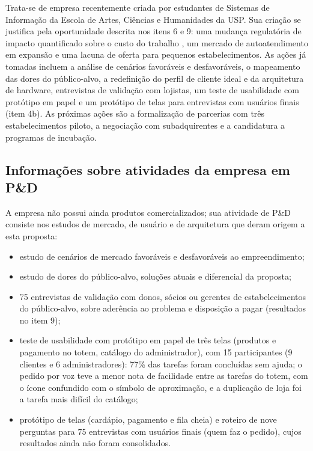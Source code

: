 \documentclass[12pt,a4paper]{article}
\begin{document}
Trata-se de empresa recentemente criada por estudantes de Sistemas de Informação da Escola de Artes, Ciências e Humanidades da USP. Sua criação se justifica pela oportunidade descrita nos itens 6 e 9: uma mudança regulatória de impacto quantificado sobre o custo do trabalho \cite{fecomercio2026, abrasel2026}, um mercado de autoatendimento em expansão \cite{pegn2026} e uma lacuna de oferta para pequenos estabelecimentos. As ações já tomadas incluem a análise de cenários favoráveis e desfavoráveis, o mapeamento das dores do público-alvo, a redefinição do perfil de cliente ideal e da arquitetura de hardware, entrevistas de validação com lojistas, um teste de usabilidade com protótipo em papel e um protótipo de telas para entrevistas com usuários finais (item 4b). As próximas ações são a formalização de parcerias com três estabelecimentos piloto, a negociação com subadquirentes e a candidatura a programas de incubação.

\subsection{Informações sobre atividades da empresa em P\&D}

A empresa não possui ainda produtos comercializados; sua atividade de P\&D consiste nos estudos de mercado, de usuário e de arquitetura que deram origem a esta proposta:

\begin{itemize}
    \item estudo de cenários de mercado favoráveis e desfavoráveis ao empreendimento;
    \item estudo de dores do público-alvo, soluções atuais e diferencial da proposta;
    \item 75 entrevistas de validação com donos, sócios ou gerentes de estabelecimentos do público-alvo, sobre aderência ao problema e disposição a pagar (resultados no item 9);
    \item teste de usabilidade com protótipo em papel de três telas (produtos e pagamento no totem, catálogo do administrador), com 15 participantes (9 clientes e 6 administradores): 77\% das tarefas foram concluídas sem ajuda; o pedido por voz teve a menor nota de facilidade entre as tarefas do totem, com o ícone confundido com o símbolo de aproximação, e a duplicação de loja foi a tarefa mais difícil do catálogo;
    \item protótipo de telas (cardápio, pagamento e fila cheia) e roteiro de nove perguntas para 75 entrevistas com usuários finais (quem faz o pedido), cujos resultados ainda não foram consolidados.
\end{itemize}
\end{document}
